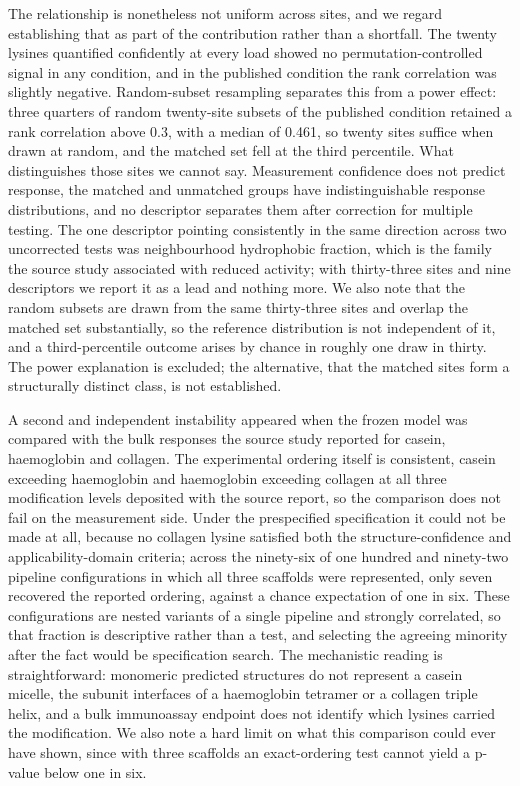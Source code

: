 \documentclass[journal=jprobs,manuscript=article,layout=traditional]{achemso}
\begin{document}
The relationship is nonetheless not uniform across sites, and we regard establishing that as part of the contribution rather than a shortfall. The twenty lysines quantified confidently at every load showed no permutation-controlled signal in any condition, and in the published condition the rank correlation was slightly negative. Random-subset resampling separates this from a power effect: three quarters of random twenty-site subsets of the published condition retained a rank correlation above 0.3, with a median of 0.461, so twenty sites suffice when drawn at random, and the matched set fell at the third percentile. What distinguishes those sites we cannot say. Measurement confidence does not predict response, the matched and unmatched groups have indistinguishable response distributions, and no descriptor separates them after correction for multiple testing. The one descriptor pointing consistently in the same direction across two uncorrected tests was neighbourhood hydrophobic fraction, which is the family the source study associated with reduced activity; with thirty-three sites and nine descriptors we report it as a lead and nothing more. We also note that the random subsets are drawn from the same thirty-three sites and overlap the matched set substantially, so the reference distribution is not independent of it, and a third-percentile outcome arises by chance in roughly one draw in thirty. The power explanation is excluded; the alternative, that the matched sites form a structurally distinct class, is not established.

A second and independent instability appeared when the frozen model was compared with the bulk responses the source study reported for casein, haemoglobin and collagen. The experimental ordering itself is consistent, casein exceeding haemoglobin and haemoglobin exceeding collagen at all three modification levels deposited with the source report, so the comparison does not fail on the measurement side. Under the prespecified specification it could not be made at all, because no collagen lysine satisfied both the structure-confidence and applicability-domain criteria; across the ninety-six of one hundred and ninety-two pipeline configurations in which all three scaffolds were represented, only seven recovered the reported ordering, against a chance expectation of one in six. These configurations are nested variants of a single pipeline and strongly correlated, so that fraction is descriptive rather than a test, and selecting the agreeing minority after the fact would be specification search. The mechanistic reading is straightforward: monomeric predicted structures do not represent a casein micelle, the subunit interfaces of a haemoglobin tetramer or a collagen triple helix, and a bulk immunoassay endpoint does not identify which lysines carried the modification. We also note a hard limit on what this comparison could ever have shown, since with three scaffolds an exact-ordering test cannot yield a p-value below one in six.
\end{document}
